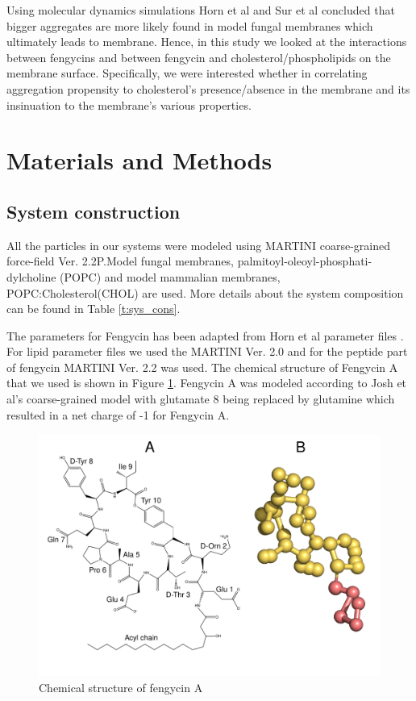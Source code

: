  Using molecular dynamics simulations Horn et al \cite{Grossfield2013} and 
 Sur et al \cite{Grossfield2018} concluded 
 that bigger aggregates are more likely found in model fungal membranes which  
 ultimately leads to membrane. Hence, in this study we looked at the interactions 
 between fengycins and between fengycin and cholesterol/phospholipids on the membrane 
 surface. Specifically, we were interested whether in correlating aggregation 
 propensity to cholesterol's presence/absence in the membrane and its insinuation to
 the membrane's various properties.
 
 \section{Materials and Methods}
\label{s:methods}

\subsection{System construction}
\label{ss:sys_cons}
All the particles in our systems were modeled using MARTINI 
coarse-grained force-field Ver. 2.2P.Model fungal membranes,
palmitoyl-oleoyl-phosphati- dylcholine (POPC) and model mammalian membranes, POPC:Cholesterol(CHOL) are used.
 More details about the system composition
can be found in Table \ref{t:sys_cons}.

The parameters for Fengycin has been adapted from Horn et al parameter files \cite{Grossfield2013}.
For lipid parameter files we used the MARTINI Ver. 2.0 and for the peptide part of fengycin  MARTINI Ver. 2.2 was used.
The chemical structure of Fengycin A that we used is shown in Figure \ref{f:chem_str}.
Fengycin A was modeled according to Josh et al's coarse-grained model \cite{Grossfield2013}
with glutamate 8 being replaced by glutamine which resulted in a net charge of -1 for Fengycin A.


\begin{figure}[h!]
\centering
\includegraphics[width=1.0\textwidth]{chapter3_figs/comb_str_feng.pdf}
\caption{Chemical structure of fengycin A}
\label{f:chem_str}
\end{figure}

